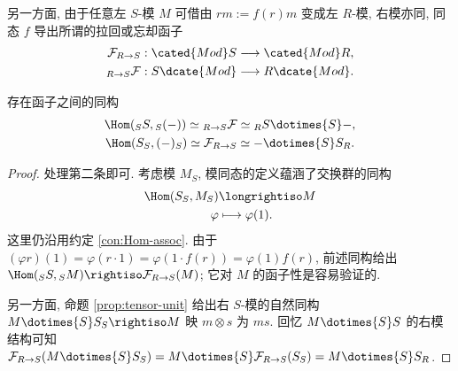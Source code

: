 另一方面, 由于任意左 $S$-模 $M$ 可借由 $rm := f(r)m$ 变成左 $R$-模, 右模亦同, 同态 $f$ 导出所谓的拉回或忘却函子  
\begin{align*}
	\mathcal{F}_{R \to S}: \cated{Mod}S & \longrightarrow \cated{Mod}R, \\
	{}_{R \to S} \mathcal{F}: S\dcate{Mod} & \longrightarrow R\dcate{Mod}.
\end{align*}

\begin{lemma}\label{prop:forgetful-as-tensor-Hom}
	存在函子之间的同构
	\begin{gather*}
		\Hom({}_S S, {}_S (-)) \simeq {}_{R \to S} \mathcal{F} \simeq {}_R S \dotimes{S} - , \\
		\Hom(S_S, (-)_S) \simeq \mathcal{F}_{R \to S} \simeq - \dotimes{S} S_R.
	\end{gather*}
\end{lemma}
\begin{proof}
	处理第二条即可. 考虑模 $M_S$, 模同态的定义蕴涵了交换群的同构
	\begin{align*}
		\Hom(S_S, M_S) & \longrightiso M \\
		\varphi & \longmapsto \varphi(1).
	\end{align*}
	这里仍沿用约定 \ref{con:Hom-assoc}. 由于 $(\varphi r)(1) = \varphi(r \cdot 1) = \varphi(1 \cdot f(r)) = \varphi(1) f(r)$, 前述同构给出 $\Hom({}_S S, {}_S M) \rightiso \mathcal{F}_{R \to S}(M)$; 它对 $M$ 的函子性是容易验证的.

	另一方面, 命题 \ref{prop:tensor-unit} 给出右 $S$-模的自然同构 $M \dotimes{S} S_S \rightiso M$ 映 $m \otimes s$ 为 $ms$. 回忆 $M \dotimes{S} S$ 的右模结构可知 $\mathcal{F}_{R \to S} (M \dotimes{S} S_S) = M \dotimes{S} \mathcal{F}_{R \to S}(S_S) = M \dotimes{S} S_R$.
\end{proof}

